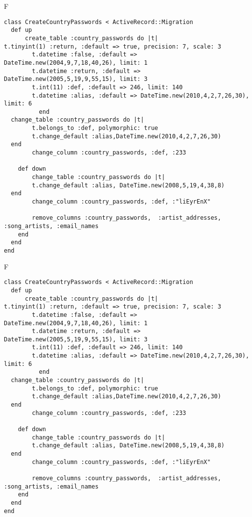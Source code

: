 F
\begin{verbatim}
class CreateCountryPasswords < ActiveRecord::Migration
  def up
	  create_table :country_passwords do |t|
t.tinyint(1) :return, :default => true, precision: 7, scale: 3
		t.datetime :false, :default => DateTime.new(2004,9,7,18,40,26), limit: 1
		t.datetime :return, :default => DateTime.new(2005,5,19,9,55,15), limit: 3
		t.int(11) :def, :default => 246, limit: 140
		t.datetime :alias, :default => DateTime.new(2010,4,2,7,26,30), limit: 6
		  end
  change_table :country_passwords do |t|
		t.belongs_to :def, polymorphic: true
 		t.change_default :alias,DateTime.new(2010,4,2,7,26,30)
  end
 		change_column :country_passwords, :def, :233
   
	def down
		change_table :country_passwords do |t|
		t.change_default :alias, DateTime.new(2008,5,19,4,38,8)
  end
 		change_column :country_passwords, :def, :"liEyrEnX"
   
		remove_columns :country_passwords,  :artist_addresses, :song_artists, :email_names 
    end 
  end
end

\end{verbatim}

F
\begin{verbatim}
class CreateCountryPasswords < ActiveRecord::Migration
  def up
	  create_table :country_passwords do |t|
t.tinyint(1) :return, :default => true, precision: 7, scale: 3
		t.datetime :false, :default => DateTime.new(2004,9,7,18,40,26), limit: 1
		t.datetime :return, :default => DateTime.new(2005,5,19,9,55,15), limit: 3
		t.int(11) :def, :default => 246, limit: 140
		t.datetime :alias, :default => DateTime.new(2010,4,2,7,26,30), limit: 6
		  end
  change_table :country_passwords do |t|
		t.belongs_to :def, polymorphic: true
 		t.change_default :alias,DateTime.new(2010,4,2,7,26,30)
  end
 		change_column :country_passwords, :def, :233
   
	def down
		change_table :country_passwords do |t|
		t.change_default :alias, DateTime.new(2008,5,19,4,38,8)
  end
 		change_column :country_passwords, :def, :"liEyrEnX"
   
		remove_columns :country_passwords,  :artist_addresses, :song_artists, :email_names 
    end 
  end
end

\end{verbatim}

